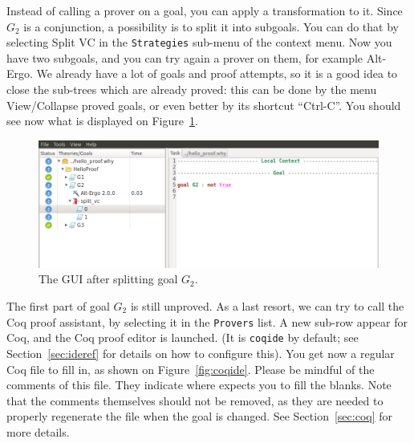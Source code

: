 Instead of calling a prover on a goal, you can apply a transformation
to it.  Since $G_2$ is a conjunction, a possibility is to split it
into subgoals. You can do that by selecting \textsf{Split VC} in the
\texttt{Strategies} sub-menu of the context menu. Now you have two
subgoals, and you can try again a prover on them, for example
Alt-Ergo. We already have a lot of goals and proof attempts, so it is
a good idea to close the sub-trees which are already proved: this can
be done by the menu \textsf{View/Collapse proved goals}, or even
better by its shortcut ``Ctrl-C''.  You should see now what is
displayed on Figure~\ref{fig:gui4}.

\begin{figure}[tbp]
 \includegraphics[width=\textwidth]{gui-4.png}
  \caption{The GUI after splitting goal $G_2$.}
  \label{fig:gui4}
\end{figure}

The first part of goal $G_2$ is still unproved. As a last resort, we
can try to call the Coq proof assistant, by selecting it in the
\texttt{Provers} list.
A new sub-row appear for Coq, and the Coq proof editor is launched.
(It is \texttt{coqide} by default; see
Section~\ref{sec:ideref} for details on how to configure this). You get
now a regular Coq file to fill in, as shown on Figure~\ref{fig:coqide}.
Please be mindful of the comments of this file. They indicate where \why
expects you to fill the blanks. Note that the comments themselves should
not be removed, as they are needed to properly regenerate the file when the
goal is changed. See Section~\ref{sec:coq} for more details.

